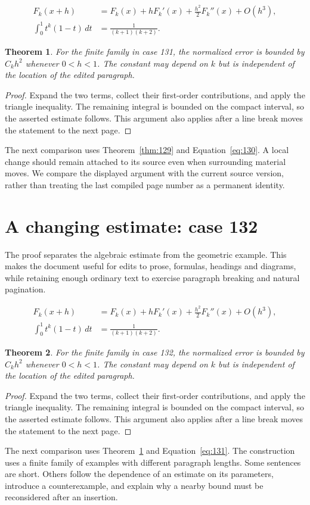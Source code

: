 \documentclass[a4paper,10pt]{article}
\newtheorem{theorem}{Theorem}[section]
\begin{document}
\lipsum[1-2]
\begin{align}\label{eq:130}
 F_k(x+h)&=F_k(x)+hF_k'(x)+\frac{h^2}{2}F_k''(x)+O(h^3),\\
 \int_0^1 t^k(1-t)\,dt&=\frac{1}{(k+1)(k+2)}.
\end{align}
\begin{theorem}\label{thm:130}
For the finite family in case 131, the normalized error is bounded by $C_k h^2$ whenever $0<h<1$. The constant may depend on $k$ but is independent of the location of the edited paragraph.
\end{theorem}
\begin{proof}
Expand the two terms, collect their first-order contributions, and apply the
triangle inequality. The remaining integral is bounded on the compact interval,
so the asserted estimate follows. This argument also applies after a line break
moves the statement to the next page.
\end{proof}
The next comparison uses Theorem~\ref{thm:129} and Equation~\ref{eq:130}. A local change should remain attached to its source even when surrounding material moves. We compare the displayed argument with the current source version, rather than treating the last compiled page number as a permanent identity.

\lipsum[3]

\section{A changing estimate: case 132}\label{unit:131}
The proof separates the algebraic estimate from the geometric example. This makes the document useful for edits to prose, formulas, headings and diagrams, while retaining enough ordinary text to exercise paragraph breaking and natural pagination.

\lipsum[4-5]
\begin{align}\label{eq:131}
 F_k(x+h)&=F_k(x)+hF_k'(x)+\frac{h^2}{2}F_k''(x)+O(h^3),\\
 \int_0^1 t^k(1-t)\,dt&=\frac{1}{(k+1)(k+2)}.
\end{align}
\begin{theorem}\label{thm:131}
For the finite family in case 132, the normalized error is bounded by $C_k h^2$ whenever $0<h<1$. The constant may depend on $k$ but is independent of the location of the edited paragraph.
\end{theorem}
\begin{proof}
Expand the two terms, collect their first-order contributions, and apply the
triangle inequality. The remaining integral is bounded on the compact interval,
so the asserted estimate follows. This argument also applies after a line break
moves the statement to the next page.
\end{proof}
The next comparison uses Theorem~\ref{thm:130} and Equation~\ref{eq:131}. The construction uses a finite family of examples with different paragraph lengths. Some sentences are short. Others follow the dependence of an estimate on its parameters, introduce a counterexample, and explain why a nearby bound must be reconsidered after an insertion.
\end{document}
